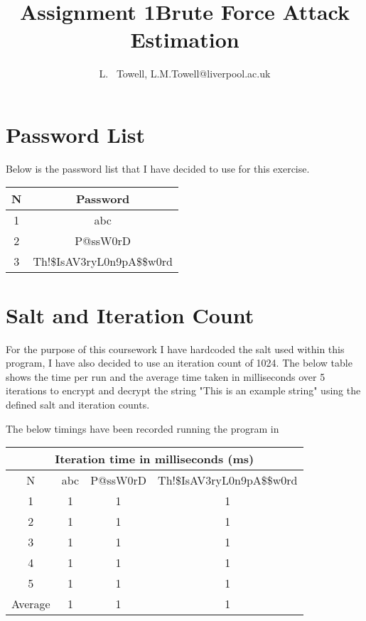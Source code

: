 \documentclass[a4paper, twoside, 11pt]{article}
\author{L. ~Towell, L.M.Towell@liverpool.ac.uk}
\title{Assignment 1\break Brute Force Attack Estimation}
\begin{document}
	\maketitle

\maketitle
\section{Password List}
Below is the password list that I have decided to use for this exercise.
\begin{center}
	\begin{tabular}{ |c|c| } 
	 \hline
	 N & Password \\
	 \hline
	 1 & abc \\ 
	 2 & P@ssW0rD \\ 
	 3 & Th!\$IsAV3ryL0n9pA\$\$w0rd \\ 
	 \hline
	\end{tabular}
\end{center}

\section{Salt and Iteration Count}
For the purpose of this coursework I have hardcoded the salt used within this program, 
I have also decided to use an iteration count of 1024. The below table shows the time per run and the average time
 taken in milliseconds over 5 iterations to encrypt and decrypt the string "This is an example string" using the 
 defined salt and iteration counts.

 The below timings have been recorded running the program in 

\begin{center}
	\begin{tabular}{ |c|c|c|c| } 
	 \hline
	 \multicolumn{4}{|c|}{Iteration time in milliseconds (ms)} \\
	 \hline
	 N & abc & P@ssW0rD & Th!\$IsAV3ryL0n9pA\$\$w0rd \\
	 \hline
	 1 & 1 & 1 & 1 \\ 
	 2 & 1 & 1 & 1  \\ 
	 3 & 1 & 1 & 1  \\ 
	 4 & 1 & 1 & 1  \\
	 5 & 1 & 1 & 1  \\
	 \hline
	 \hline
	 Average & 1 & 1 & 1  \\
	 \hline
	\end{tabular}
\end{center}
\end{document}
